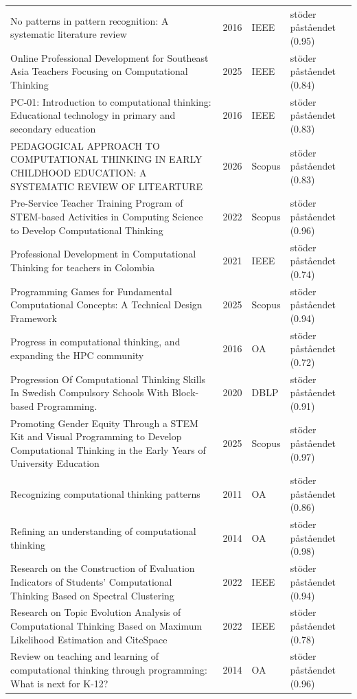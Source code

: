 \begin{longtable}{@{}%
  >{\raggedright\arraybackslash}p{}c%
  >{\raggedright\arraybackslash}p{}%
  >{\raggedright\arraybackslash}p{}@{}}
No patterns in pattern recognition: A systematic literature review & 2016 & IEEE & stöder påståendet (0.95) \\
Online Professional Development for Southeast Asia Teachers Focusing on Computational Thinking & 2025 & IEEE & stöder påståendet (0.84) \\
PC-01: Introduction to computational thinking: Educational technology in primary and secondary education & 2016 & IEEE & stöder påståendet (0.83) \\
PEDAGOGICAL APPROACH TO COMPUTATIONAL THINKING IN EARLY CHILDHOOD EDUCATION: A SYSTEMATIC REVIEW OF LITEARTURE & 2026 & Scopus & stöder påståendet (0.83) \\
Pre-Service Teacher Training Program of STEM-based Activities in Computing Science to Develop Computational Thinking & 2022 & Scopus & stöder påståendet (0.96) \\
Professional Development in Computational Thinking for teachers in Colombia & 2021 & IEEE & stöder påståendet (0.74) \\
Programming Games for Fundamental Computational Concepts: A Technical Design Framework & 2025 & Scopus & stöder påståendet (0.94) \\
Progress in computational thinking, and expanding the HPC community & 2016 & OA & stöder påståendet (0.72) \\
Progression Of Computational Thinking Skills In Swedish Compulsory Schools With Block-based Programming. & 2020 & DBLP & stöder påståendet (0.91) \\
Promoting Gender Equity Through a STEM Kit and Visual Programming to Develop Computational Thinking in the Early Years of University Education & 2025 & Scopus & stöder påståendet (0.97) \\
Recognizing computational thinking patterns & 2011 & OA & stöder påståendet (0.86) \\
Refining an understanding of computational thinking & 2014 & OA & stöder påståendet (0.98) \\
Research on the Construction of Evaluation Indicators of Students' Computational Thinking Based on Spectral Clustering & 2022 & IEEE & stöder påståendet (0.94) \\
Research on Topic Evolution Analysis of Computational Thinking Based on Maximum Likelihood Estimation and CiteSpace & 2022 & IEEE & stöder påståendet (0.78) \\
Review on teaching and learning of computational thinking through programming: What is next for K-12? & 2014 & OA & stöder påståendet (0.96) \\

\end{longtable}
